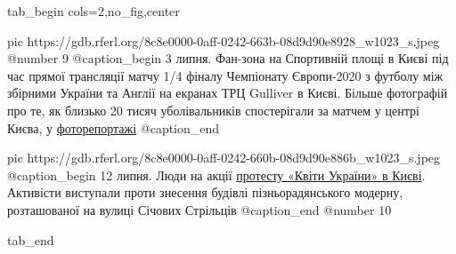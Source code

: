  
 
 
 
 


\ifcmt
  tab_begin cols=2,no_fig,center

     pic https://gdb.rferl.org/8c8e0000-0aff-0242-663b-08d9d90e8928_w1023_s.jpeg
		 @number 9
		 @caption_begin
3 липня. Фан-зона на Спортивній площі в Києві під час прямої трансляції
матчу 1/4 фіналу Чемпіонату Європи-2020 з футболу між збірними України
та Англії на екранах ТРЦ Gulliver в Києві. Більше фотографій про те, як
близько 20 тисяч уболівальників спостерігали за матчем у центрі Києва, у
\href{https://www.radiosvoboda.org/a/photo-vbolivalnyky/31339971.html}{фоторепортажі}
		 @caption_end

		 pic https://gdb.rferl.org/8c8e0000-0aff-0242-660b-08d9d90e886b_w1023_s.jpeg
		 @caption_begin
12 липня. Люди на акції
\href{https://www.radiosvoboda.org/a/u-kyyevi-pochaly-demontazh-modernistskoyi-budivli-kvity-ukrayiny/31355106.html}{протесту
«Квіти України» в Києві}. Активісти виступали проти знесення будівлі
пізньорадянського модерну, розташованої на вулиці Січових Стрільців 
		 @caption_end
		 @number 10

  tab_end
\fi
